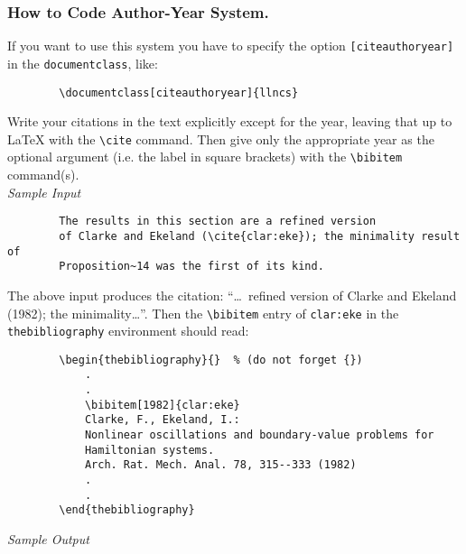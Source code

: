 \documentclass{llncs}
\begin{document}
    \subsubsection*{How to Code Author-Year System.}
    If you want to use this system you have to specify the option
    \verb|[citeauthoryear]| in the \verb|documentclass|, like:
    \begin{verbatim}
        \documentclass[citeauthoryear]{llncs}
    \end{verbatim}
    Write your citations in the text explicitly except for the year, leaving
    that up to \LaTeX{} with the \verb|\cite| command. Then give only the
    appropriate year as the optional argument (i.e. the label in square
    brackets) with the \verb|\bibitem| command(s).\\[2mm]
    {\itshape Sample Input}
    \begin{verbatim}
        The results in this section are a refined version
        of Clarke and Ekeland (\cite{clar:eke}); the minimality result of
        Proposition~14 was the first of its kind.
    \end{verbatim}
    The above input produces the citation: ``\dots\ refined version of
    Clarke and Ekeland (1982); the minimality\dots''. Then the
    \verb|\bibitem| entry of \verb|clar:eke| in the \verb|thebibliography|
    environment should read:
    \begin{verbatim}
        \begin{thebibliography}{}  % (do not forget {})
            .
            .
            \bibitem[1982]{clar:eke}
            Clarke, F., Ekeland, I.:
            Nonlinear oscillations and boundary-value problems for
            Hamiltonian systems.
            Arch. Rat. Mech. Anal. 78, 315--333 (1982)
            .
            .
        \end{thebibliography}
    \end{verbatim}
    {\itshape Sample Output}
    \bibauthoryear
\end{document}
